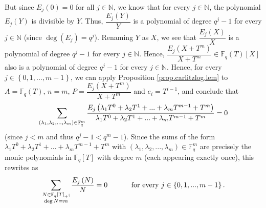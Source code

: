 \documentclass[numbers=enddot,12pt,final,onecolumn,notitlepage]{scrartcl}%
\theoremstyle{definition}
\let\sumnonlimits\sum
\renewcommand{\sum}{\sumnonlimits\limits}
\begin{document}
But since $E_{j}\left(  0\right)  =0$ for all $j\in\mathbb{N}$, we know that
for every $j\in\mathbb{N}$, the polynomial $E_{j}\left(  Y\right)  $ is
divisible by $Y$. Thus, $\dfrac{E_{j}\left(  Y\right)  }{Y}$ is a polynomial
of degree $q^{j}-1$ for every $j\in\mathbb{N}$ (since $\deg\left(
E_{j}\right)  =q^{j}$). Renaming $Y$ as $X$, we see that $\dfrac{E_{j}\left(
X\right)  }{X}$ is a polynomial of degree $q^{j}-1$ for every $j\in\mathbb{N}%
$. Hence, $\dfrac{E_{j}\left(  X+T^{m}\right)  }{X+T^{m}}\in\mathbb{F}%
_{q}\left(  T\right)  \left[  X\right]  $ also is a polynomial of degree
$q^{j}-1$ for every $j\in\mathbb{N}$. Hence, for every $j\in\left\{
0,1,...,m-1\right\}  $, we can apply Proposition \ref{prop.carlitzlog.lem} to
$A=\mathbb{F}_{q}\left(  T\right)  $, $n=m$, $P=\dfrac{E_{j}\left(
X+T^{m}\right)  }{X+T^{m}}$ and $e_{i}=T^{i-1}$, and conclude that
\[
\sum\limits_{\left(  \lambda_{1},\lambda_{2},...,\lambda_{m}\right)
\in\mathbb{F}_{q}^{m}}\dfrac{E_{j}\left(  \lambda_{1}T^{0}+\lambda_{2}%
T^{1}+...+\lambda_{m}T^{m-1}+T^{m}\right)  }{\lambda_{1}T^{0}+\lambda_{2}%
T^{1}+...+\lambda_{m}T^{m-1}+T^{m}}=0
\]
(since $j<m$ and thus $q^{j}-1<q^{m}-1$). Since the sums of the form
$\lambda_{1}T^{0}+\lambda_{2}T^{1}+...+\lambda_{m}T^{m-1}+T^{m}$ with $\left(
\lambda_{1},\lambda_{2},...,\lambda_{m}\right)  \in\mathbb{F}_{q}^{m}$ are
precisely the monic polynomials in $\mathbb{F}_{q}\left[  T\right]  $ with
degree $m$ (each appearing exactly once), this rewrites as%
\begin{equation}
\sum\limits_{\substack{N\in\mathbb{F}_{q}\left[  T\right]  _{+};\\\deg
N=m}}\dfrac{E_{j}\left(  N\right)  }{N}=0\ \ \ \ \ \ \ \ \ \ \text{for every
}j\in\left\{  0,1,...,m-1\right\}  \text{.} \label{pf.carlitzlog.lem2.8}%
\end{equation}
\end{document}
